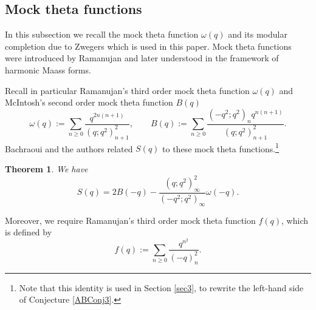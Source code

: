 \documentclass[12pt,reqno]{amsart}
\renewcommand{\o}{{\omega}}
\renewcommand{\(}{\left\(}
\renewcommand{\)}{\right\)}
\numberwithin{equation}{section}
\theoremstyle{plain}
\newtheorem{theorem}{Theorem}[section]
\theoremstyle{definition}
\numberwithin{equation}{section}
\begin{document}

\subsection{Mock theta functions} In this subsection we recall the mock theta function $\o(q)$ and its modular completion due to Zwegers which is used in this paper. Mock theta functions were introduced by Ramanujan and later understood in the framework of harmonic Maass forms.

Recall in particular Ramanujan's third order mock theta function $\o(q)$ and McIntosh's \cite{McIntosh} second order mock theta function $B(q)$ %
\begin{equation*}%
\omega(q):=\sum_{n\ge0}\frac{q^{2n(n+1)}}{\left(q;q^2\right)^2_{n+1}},\qquad B(q):=\sum_{n\ge 0}\frac{\left(-q^2;q^2\right)_n q^{n(n+1)}}{\left(q;q^2\right)^2_{n+1}}.
\end{equation*}
Bachraoui and the authors \cite[Theorem 1.1]{BBB} related $S(q)$ to these mock theta functions.\footnote{Note that this identity is used in Section \ref{sec3}, to rewrite the left-hand side of Conjecture \ref{ABConj3}.}
\begin{theorem}\label{BBBthm}
	We have
	\[
	S(q)=2B(-q)-\frac{\left(q;q^2\right)^2_{\infty}}{\left(-q^2;q^2\right)_{\infty}}\o(-q).
	\]
\end{theorem}



Moreover, we require Ramanujan's third order mock theta function $f(q)$, which is defined by
\begin{equation*}%
f(q):=\sum_{n\ge0}\frac{q^{n^2}}{\left(-q\right)^2_{n}}.
\end{equation*}
\end{document}

